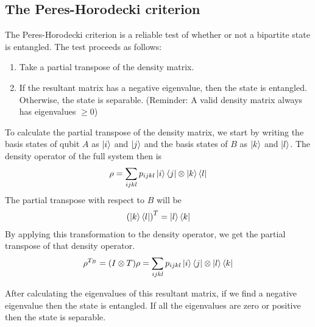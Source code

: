 \subsection{The Peres-Horodecki criterion}
The Peres-Horodecki criterion is a reliable test of whether or not a bipartite state is entangled. The test proceeds as follows:
\begin{enumerate}
  \item Take a partial transpose of the density matrix.
  \item If the resultant matrix has a negative eigenvalue, then the state is entangled. Otherwise, the state is separable. (Reminder: A valid density matrix always has eigenvalues $\geq 0$)
\end{enumerate}
\par To calculate the partial transpose of the density matrix, we start by writing the basis states of qubit $A$ as $\ket{i}$ and $\ket{j}$ and the basis states of $B$ as $\ket{k}$ and $\ket{l}$. The density operator of the full system then is
\begin{align*}
\rho = \sum_{ijkl} p_{ijkl} \ket{i} \bra{j} \otimes \ket{k} \bra{l}
\end{align*}
The partial transpose with respect to $B$ will be
\begin{align*}
\left( \ket{k} \bra{l} \right)^T = \ket{l} \bra{k}
\end{align*}
By applying this transformation to the density operator, we get the partial transpose of that density operator.
\begin{align*}
\rho^{T_B} = (I \otimes T) \rho = \sum_{ijkl} p_{ijkl} \ket{i} \bra{j} \otimes \ket{l} \bra{k}
\end{align*}
\par After calculating the eigenvalues of this resultant matrix, if we find a negative eigenvalue then the state is entangled. If all the eigenvalues are zero or positive then the state is separable. \cite{vedralteleportation}

